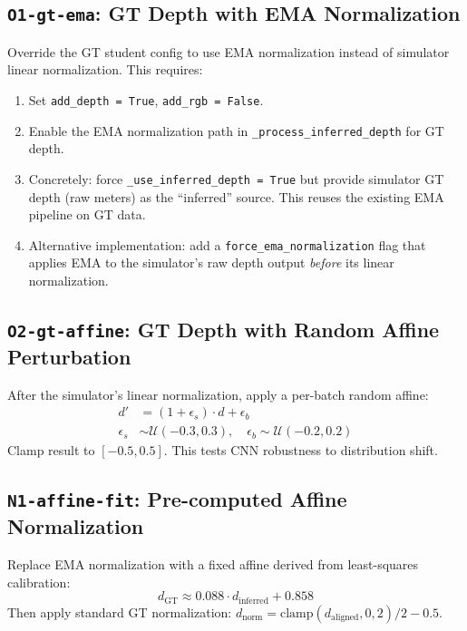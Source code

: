 \documentclass[11pt,a4paper]{article}
\begin{document}
\subsection{\texttt{O1-gt-ema}: GT Depth with EMA Normalization}

Override the GT student config to use EMA normalization instead of
simulator linear normalization.  This requires:
\begin{enumerate}[nosep]
  \item Set \texttt{add\_depth = True}, \texttt{add\_rgb = False}.
  \item Enable the EMA normalization path in
        \texttt{\_process\_inferred\_depth} for GT depth.
  \item Concretely: force \texttt{\_use\_inferred\_depth = True} but
        provide simulator GT depth (raw meters) as the ``inferred'' source.
        This reuses the existing EMA pipeline on GT data.
  \item Alternative implementation: add a
        \texttt{force\_ema\_normalization} flag that applies EMA to the
        simulator's raw depth output \emph{before} its linear normalization.
\end{enumerate}

\subsection{\texttt{O2-gt-affine}: GT Depth with Random Affine Perturbation}

After the simulator's linear normalization, apply a per-batch random
affine:
\begin{align*}
  d' &= (1 + \epsilon_s) \cdot d + \epsilon_b \\
  \epsilon_s &\sim \mathcal{U}(-0.3, 0.3), \quad
  \epsilon_b \sim \mathcal{U}(-0.2, 0.2)
\end{align*}
Clamp result to $[-0.5, 0.5]$.  This tests CNN robustness to distribution shift.

\subsection{\texttt{N1-affine-fit}: Pre-computed Affine Normalization}

Replace EMA normalization with a fixed affine derived from least-squares
calibration:
\[
  d_{\text{GT}} \approx 0.088 \cdot d_{\text{inferred}} + 0.858
\]
Then apply standard GT normalization:
$d_{\text{norm}} = \text{clamp}(d_{\text{aligned}}, 0, 2) / 2 - 0.5$.
\end{document}
